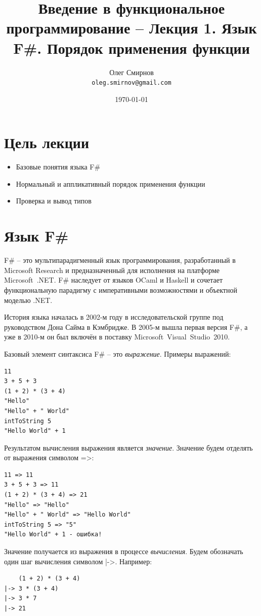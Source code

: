 \documentclass[a4paper,11pt]{article}
\author{Олег Смирнов\\
\texttt{oleg.smirnov@gmail.com}}
\date{\today}
\title{Введение в функциональное программирование -- Лекция 1. Язык F\#.
Порядок применения функции}
\begin{document}
\maketitle
\tableofcontents
\newpage

\section*{Цель лекции}
\begin{itemize}
\item Базовые понятия языка F\#
\item Нормальный и аппликативный порядок применения функции
\item Проверка и вывод типов
\end{itemize}

\section{Язык F\#}

F\# -- это мультипарадигменный язык программирования, разработанный в Microsoft
Research и предназначенный для исполнения на платформе Microsoft~.NET. F\#
наследует от языков OCaml и Haskell и сочетает функциональную парадигму с
императивными возможностями и объектной моделью .NET.

История языка началась в 2002-м году в исследовательской группе под руководством
Дона Сайма в Кэмбридже. В 2005-м вышла первая версия F\#, а уже в 2010-м он был
включён в поставку Microsoft~Visual~Studio~2010.

Базовый элемент синтаксиса F\# -- это \emph{выражение}. Примеры выражений:
\begin{lstlisting}
11
3 + 5 + 3
(1 + 2) * (3 + 4)
"Hello"
"Hello" + " World"
intToString 5
"Hello World" + 1
\end{lstlisting}

Результатом вычисления выражения является \emph{значение}. Значение будем
отделять от выражения символом =>:
\begin{lstlisting}
11 => 11
3 + 5 + 3 => 11
(1 + 2) * (3 + 4) => 21
"Hello" => "Hello"
"Hello" + " World" => "Hello World"
intToString 5 => "5"
"Hello World" + 1 - ошибка!
\end{lstlisting}

Значение получается из выражения в процессе \emph{вычисления}. Будем обозначать
один шаг вычисления символом |->. Например:
\begin{lstlisting}
    (1 + 2) * (3 + 4)
|-> 3 * (3 + 4)
|-> 3 * 7
|-> 21
\end{lstlisting}
\end{document}
